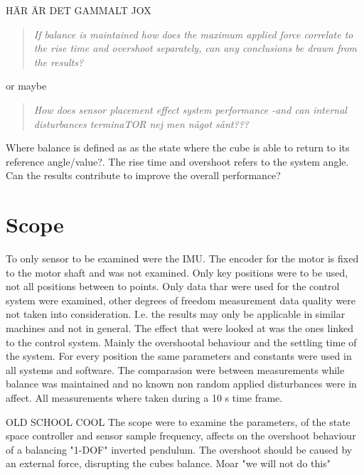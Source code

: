 \documentclass[a4paper,11pt]{kth-mag}
\newenvironment{italicquotes}
{\begin{quote}\itshape}
{\end{quote}}
\begin{document}
HÄR ÄR DET GAMMALT JOX
\begin{italicquotes}
If balance is maintained how does the maximum applied force correlate to the rise time and overshoot separately, can any conclusions be drawn from the results?
\end{italicquotes}
or maybe
\begin{italicquotes}
How does sensor placement effect system performance -and can internal disturbances terminaTOR nej men något sånt???
\end{italicquotes}
Where balance is defined as as the state where the cube is able to return to its reference angle/value?. The rise time and overshoot refers to the system angle. Can the results contribute to improve the overall performance?


\section{Scope}
To only sensor to be examined were the IMU. The encoder for the motor is fixed to the motor shaft and was not examined. Only key positions were to be used, not all positions between to points. Only data thar were used for the control system were examined, other degrees of freedom measurement data quality were not taken into consideration. I.e. the results may only be applicable in similar machines and not in general. The effect that were looked at was the ones linked to the control system. Mainly the overshootal behaviour and the settling time of the system. For every position the same parameters and constants were used in all systems and software. The comparasion were between measurements while balance was maintained and no known non random applied disturbances were in affect. All measurements where taken during a 10 s time frame. 

OLD SCHOOL COOL
The scope were to examine the parameters, of the state space controller and sensor sample frequency, affects on the overshoot behaviour of a balancing "1-DOF" inverted pendulum.
The overshoot should be caused by an external force, disrupting the cubes balance.
Moar "we will not do this"
\end{document}
